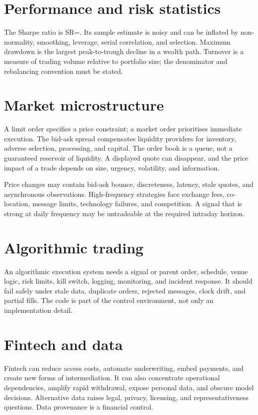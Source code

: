 \section{Performance and risk statistics}
The Sharpe ratio is
  SR=.
\closeformula
Its sample estimate is noisy and can be inflated by non-normality, smoothing, leverage, serial correlation, and selection. Maximum drawdown is the largest peak-to-trough decline in a wealth path. Turnover is a measure of trading volume relative to portfolio size; the denominator and rebalancing convention must be stated.

\section{Market microstructure}
A limit order specifies a price constraint; a market order prioritises immediate execution. The bid-ask spread compensates liquidity providers for inventory, adverse selection, processing, and capital. The order book is a queue, not a guaranteed reservoir of liquidity. A displayed quote can disappear, and the price impact of a trade depends on size, urgency, volatility, and information.

Price changes may contain bid-ask bounce, discreteness, latency, stale quotes, and asynchronous observations. High-frequency strategies face exchange fees, co-location, message limits, technology failures, and competition. A signal that is strong at daily frequency may be untradeable at the required intraday horizon.

\section{Algorithmic trading}
An algorithmic execution system needs a signal or parent order, schedule, venue logic, risk limits, kill switch, logging, monitoring, and incident response. It should fail safely under stale data, duplicate orders, rejected messages, clock drift, and partial fills. The code is part of the control environment, not only an implementation detail.

\section{Fintech and data}
Fintech can reduce access costs, automate underwriting, embed payments, and create new forms of intermediation. It can also concentrate operational dependencies, amplify rapid withdrawal, expose personal data, and obscure model decisions. Alternative data raises legal, privacy, licensing, and representativeness questions. Data provenance is a financial control.

